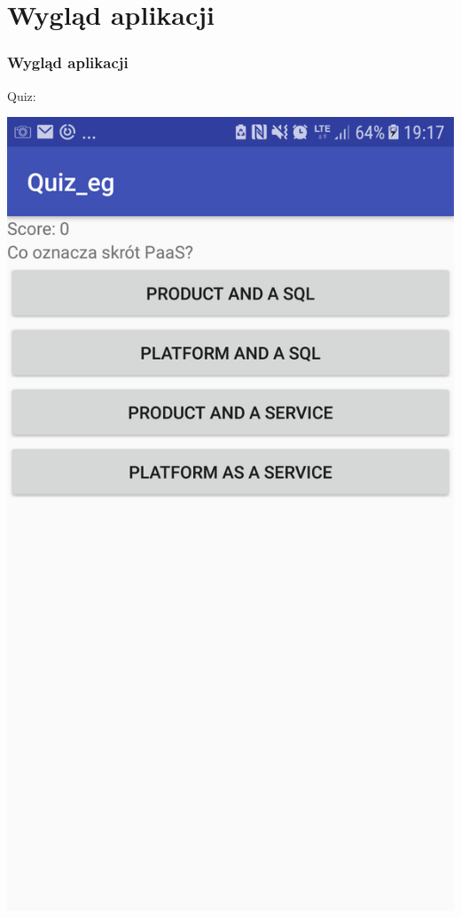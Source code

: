 \documentclass[11pt]{beamer}
\begin{document}
\section{Wygląd aplikacji}
\begin{frame}
\frametitle{Wygląd aplikacji}
Quiz:\pause
\begin{center}
\includegraphics[scale=0.2]{../imgs/Quiz1_screenshot.png}
\end{center}
\end{frame}
\end{document}
